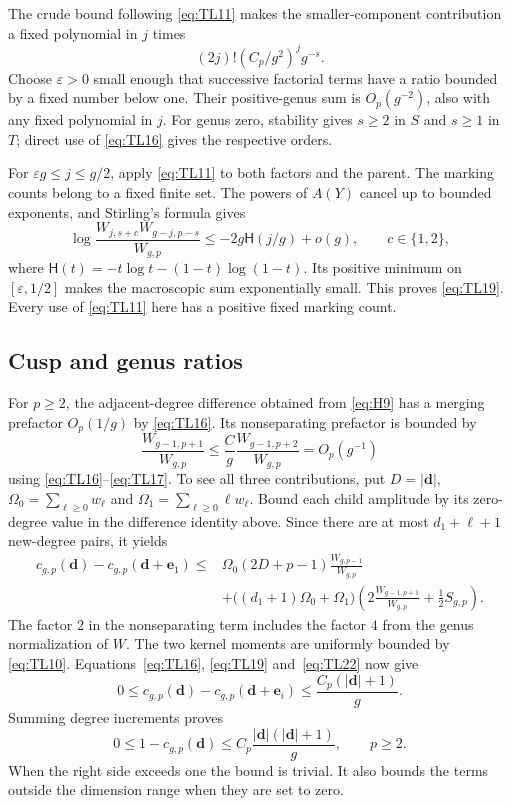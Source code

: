 The crude bound following \eqref{eq:TL11} makes the smaller-component
contribution a fixed polynomial in \(j\) times \[
 (2j)!(C_p/g^2)^j g^{-s}.
\] Choose \(\varepsilon>0\) small enough that successive factorial terms
have a ratio bounded by a fixed number below one. Their positive-genus
sum is \(O_p(g^{-2})\), also with any fixed polynomial in \(j\). For
genus zero, stability gives \(s\ge2\) in \(S\) and \(s\ge1\) in \(T\);
direct use of \eqref{eq:TL16} gives the respective orders.

For \(\varepsilon g\le j\le g/2\), apply \eqref{eq:TL11} to both factors and the
parent. The marking counts belong to a fixed finite set. The powers of
\(A(Y)\) cancel up to bounded exponents, and Stirling's formula gives \begin{equation}
\log\frac{W_{j,s+c}W_{g-j,p-s}}{W_{g,p}}
 \le-2g\mathsf H(j/g)+o(g),\qquad c\in\{1,2\},
 \label{eq:TL21}
\end{equation} where \(\mathsf H(t)=-t\log t-(1-t)\log(1-t)\). Its positive minimum
on \([\varepsilon,1/2]\) makes the macroscopic sum exponentially small.
This proves \eqref{eq:TL19}. Every use of \eqref{eq:TL11} here has a positive fixed
marking count.

\subsection{Cusp and genus ratios}\label{uniform-fixed-marking-ratios}

For \(p\ge2\), the adjacent-degree difference obtained from \eqref{eq:H9} has a
merging prefactor \(O_p(1/g)\) by \eqref{eq:TL16}. Its nonseparating prefactor is
bounded by \begin{equation}
\frac{W_{g-1,p+1}}{W_{g,p}}
 \le\frac Cg\frac{W_{g-1,p+2}}{W_{g,p}}=O_p(g^{-1})
 \label{eq:TL22}
\end{equation} using \eqref{eq:TL16}--\eqref{eq:TL17}. To see all
three contributions, put $D=|\mathbf d|$,
$\Omega_0=\sum_{\ell\ge0}w_\ell$ and
$\Omega_1=\sum_{\ell\ge0}\ell w_\ell$. Bound each child amplitude
by its zero-degree value in the difference identity above. Since there
are at most $d_1+\ell+1$ new-degree pairs, it yields
\[
 \begin{aligned}
 c_{g,p}(\mathbf d)-c_{g,p}(\mathbf d+\mathbf e_1)
 \le{}&\Omega_0(2D+p-1)\frac{W_{g,p-1}}{W_{g,p}}\\
 &+\bigl((d_1+1)\Omega_0+\Omega_1\bigr)
   \left(2\frac{W_{g-1,p+1}}{W_{g,p}}+\frac12S_{g,p}\right).
 \end{aligned}
\]
The factor $2$ in the nonseparating term includes the factor $4$
from the genus normalization of $W$. The two kernel moments are
uniformly bounded by \eqref{eq:TL10}. Equations~\eqref{eq:TL16},
\eqref{eq:TL19} and~\eqref{eq:TL22} now give \[
 0\le c_{g,p}(\mathbf d)-c_{g,p}(\mathbf d+\mathbf e_i)
 \le\frac{C_p(|\mathbf d|+1)}g.
\] Summing degree increments proves \begin{equation}
0\le1-c_{g,p}(\mathbf d)
 \le C_p\frac{|\mathbf d|(|\mathbf d|+1)}g,
 \qquad p\ge2.
 \label{eq:TL23}
\end{equation} When the right side exceeds one the bound is trivial. It also
bounds the terms outside the dimension range when they are set to zero.


